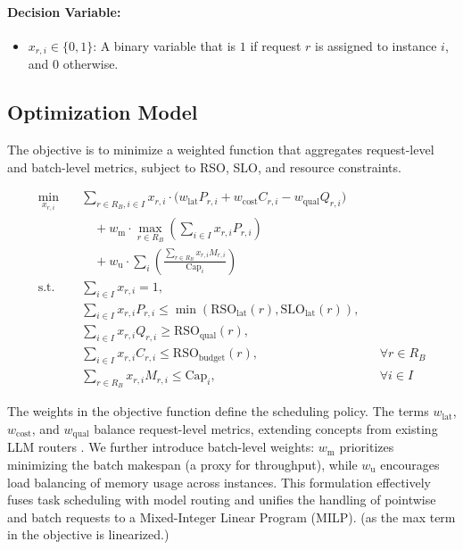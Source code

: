 \documentclass[letterpaper, anonymous, twocolumn, 10pt]{article}
\begin{document}
\paragraph{Decision Variable:}
\begin{itemize}
    \item $x_{r,i} \in \{0,1\}$: A binary variable that is $1$ if request $r$ is assigned to instance $i$, and $0$ otherwise.
\end{itemize}

\subsection{Optimization Model}
The objective is to minimize a weighted function that aggregates request-level and batch-level metrics, subject to RSO, SLO, and resource constraints.

\begin{equation}
\begin{aligned}
\min_{x_{r,i}} \quad
& \sum_{r\in R_B, i\in I} x_{r,i} \cdot \Big(w_{\text{lat}} P_{r,i} + w_{\text{cost}} C_{r,i} - w_{\text{qual}} Q_{r,i} \Big) \\
& \quad + w_{\text{m}} \cdot \max_{r \in R_B} \left( \sum_{i \in I} x_{r,i} P_{r,i} \right) \\
& \quad + w_{\text{u}} \cdot \sum_i \left( \frac{\sum_{r\in R_B} x_{r,i} M_{r,i}}{\mathrm{Cap}_i}\right) \\
\text{s.t.}\quad
& \sum_{i \in I} x_{r,i} = 1, \\
& \sum_{i \in I} x_{r,i} P_{r,i} \le \min(\mathrm{RSO}_{\text{lat}}(r), \mathrm{SLO}_{\text{lat}}(r)), \\
& \sum_{i \in I} x_{r,i} Q_{r,i} \ge \mathrm{RSO}_{\text{qual}}(r), \\
& \sum_{i \in I} x_{r,i} C_{r,i} \le \mathrm{RSO}_{\text{budget}}(r), && \forall r \in R_B \\
& \sum_{r \in R_B} x_{r,i} M_{r, i} \le \mathrm{Cap}_i, && \forall i \in I
\end{aligned}
\end{equation}

The weights in the objective function define the scheduling policy. The terms $w_{\text{lat}}$, $w_{\text{cost}}$, and $w_{\text{qual}}$ balance request-level metrics, extending concepts from existing LLM routers \cite{universal_model_routering}. We further introduce batch-level weights: $w_{\text{m}}$ prioritizes minimizing the batch makespan (a proxy for throughput), while $w_{\text{u}}$ encourages load balancing of memory usage across instances. This formulation effectively fuses task scheduling with model routing and unifies the handling of pointwise and batch requests to a Mixed-Integer Linear Program (MILP). (as the max term in the objective is linearized.) 
\end{document}
